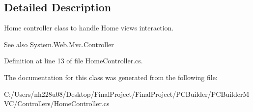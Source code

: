\subsection{Detailed Description}
Home controller class to handle Home views interaction. 

\begin{DoxySeeAlso}{See also}
System.\+Web.\+Mvc.\+Controller


\end{DoxySeeAlso}


Definition at line 13 of file Home\+Controller.\+cs.



The documentation for this class was generated from the following file\+:\begin{DoxyCompactItemize}
\item 
C\+:/\+Users/nh228u08/\+Desktop/\+Final\+Project/\+Final\+Project/\+P\+C\+Builder/\+P\+C\+Builder\+M\+V\+C/\+Controllers/Home\+Controller.\+cs\end{DoxyCompactItemize}
